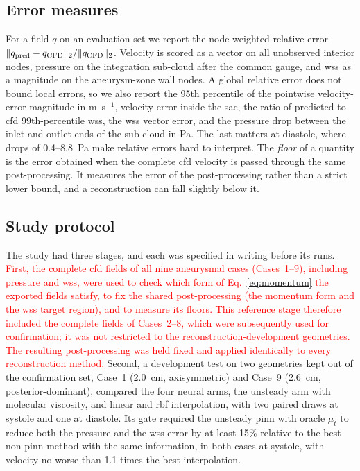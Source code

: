 \documentclass[12pt,a4paper]{article}
\newcommand{\cfdrevision}[1]{\textcolor{red}{#1}}
\newcommand{\CFD}{\ac{cfd}\xspace}
\newcommand{\PINN}{\ac{pinn}\xspace}
\newcommand{\WSS}{\ac{wss}\xspace}
\newcommand{\RBF}{\ac{rbf}\xspace}
\theoremstyle{definition}
\numberwithin{equation}{section}
\begin{document}
\subsection{Error measures}
\label{sec:metrics}
For a field $q$ on an evaluation set we report the node-weighted relative error $\|q_{\rm pred}-q_{\rm CFD}\|_2/\|q_{\rm CFD}\|_2$. Velocity is scored as a vector on all unobserved interior nodes, pressure on the integration sub-cloud after the common gauge, and \WSS as a magnitude on the aneurysm-zone wall nodes. A global relative error does not bound local errors, so we also report the 95th percentile of the pointwise velocity-error magnitude in m~s$^{-1}$, velocity error inside the sac, the ratio of predicted to \CFD 99th-percentile \WSS, the \WSS vector error, and the pressure drop between the inlet and outlet ends of the sub-cloud in Pa. The last matters at diastole, where drops of 0.4--8.8~Pa make relative errors hard to interpret. The \emph{floor} of a quantity is the error obtained when the complete \CFD velocity is passed through the same post-processing. It measures the error of the post-processing rather than a strict lower bound, and a reconstruction can fall slightly below it.

\subsection{Study protocol}
\label{sec:protocol}
The study had three stages, and each was specified in writing before its runs. \cfdrevision{First, the complete \CFD fields of all nine aneurysmal cases (Cases~1--9), including pressure and \WSS, were used to check which form of Eq.~\eqref{eq:momentum} the exported fields satisfy, to fix the shared post-processing (the momentum form and the \WSS target region), and to measure its floors. This reference stage therefore included the complete fields of Cases~2--8, which were subsequently used for confirmation; it was not restricted to the reconstruction-development geometries. The resulting post-processing was held fixed and applied identically to every reconstruction method.} Second, a development test on two geometries kept out of the confirmation set, Case~1 (2.0~cm, axisymmetric) and Case~9 (2.6~cm, posterior-dominant), compared the four neural arms, the unsteady arm with molecular viscosity, and linear and \RBF interpolation, with two paired draws at systole and one at diastole. Its gate required the unsteady \PINN with oracle $\mu_t$ to reduce both the pressure and the \WSS error by at least 15\% relative to the best non-\PINN method with the same information, in both cases at systole, with velocity no worse than 1.1 times the best interpolation.
\end{document}
